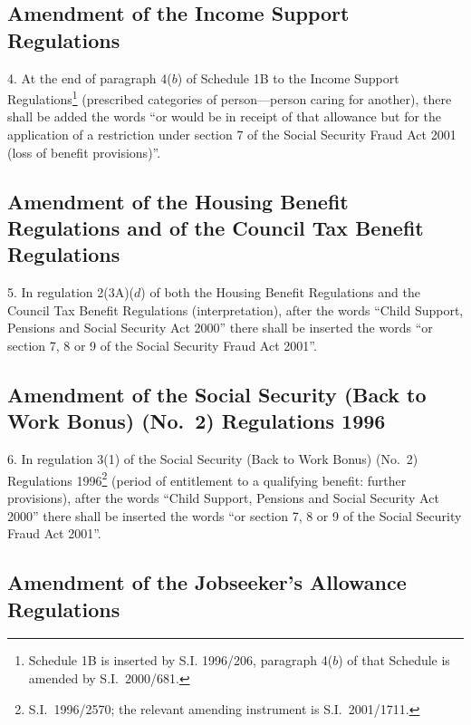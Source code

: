 \documentclass[12pt,a4paper]{article}
\begin{document}
\subsection[4. Amendment of the Income Support Regulations]{Amendment of the Income Support Regulations}

4.  At the end of paragraph 4($b$)  of Schedule 1B to the Income Support Regulations\footnote{Schedule 1B is inserted by S.I. 1996/206, paragraph 4($b$) of that Schedule is amended by S.I.\ 2000/681.} (prescribed categories of person—person caring for another), there shall be added the words “or would be in receipt of that allowance but for the application of a restriction under section 7 of the Social Security Fraud Act 2001 (loss of benefit provisions)”.

\subsection[5. Amendment of the Housing Benefit Regulations and of the Council Tax Benefit Regulations]{Amendment of the Housing Benefit Regulations and of the Council Tax Benefit Regulations}

5.  In regulation 2(3A)($d$)  of both the Housing Benefit Regulations and the Council Tax Benefit Regulations (interpretation), after the words “Child Support, Pensions and Social Security Act 2000” there shall be inserted the words “or section 7, 8 or 9 of the Social Security Fraud Act 2001”.

\subsection[6. Amendment of the Social Security (Back to Work Bonus) (No.\ 2) Regulations 1996]{Amendment of the Social Security (Back to Work Bonus) (No.\ 2) Regulations 1996}

6.  In regulation 3(1) of the Social Security (Back to Work Bonus) (No.\ 2) Regulations 1996\footnote{S.I.\ 1996/2570; the relevant amending instrument is S.I.\ 2001/1711.} (period of entitlement to a qualifying benefit: further provisions), after the words “Child Support, Pensions and Social Security Act 2000” there shall be inserted the words “or section 7, 8 or 9 of the Social Security Fraud Act 2001”.

\subsection[7. Amendment of the Jobseeker’s Allowance Regulations]{Amendment of the Jobseeker’s Allowance Regulations}
\end{document}

